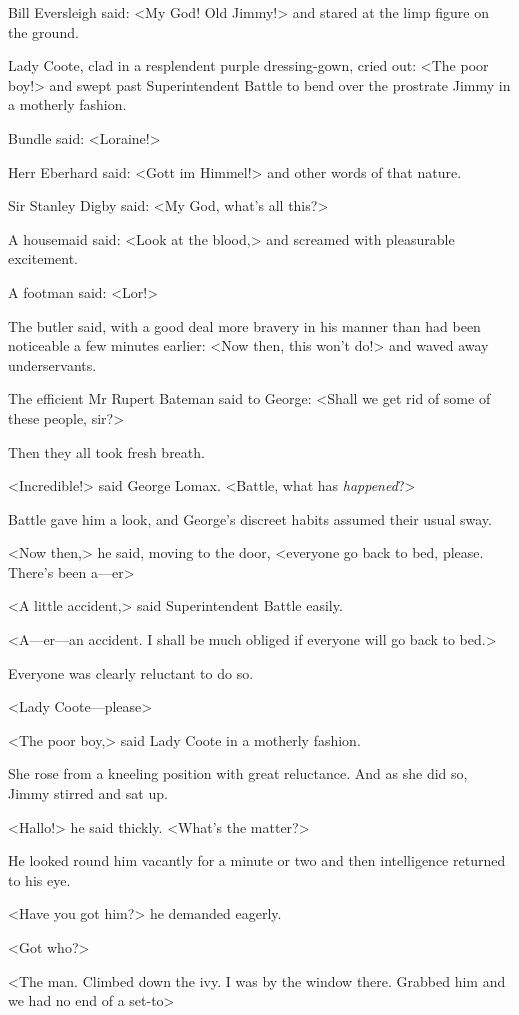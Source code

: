 Bill Eversleigh said: <My God! Old Jimmy!> and stared at the limp figure on the ground.

Lady Coote, clad in a resplendent purple dressing-gown, cried out: <The poor boy!> and swept past Superintendent Battle to bend over the prostrate Jimmy in a motherly fashion.

Bundle said: <Loraine!>

Herr Eberhard said: <Gott im Himmel!> and other words of that nature.

Sir Stanley Digby said: <My God, what's all this?>

A housemaid said: <Look at the blood,> and screamed with pleasurable excitement.

A footman said: <Lor!>

The butler said, with a good deal more bravery in his manner than had been noticeable a few minutes earlier: <Now then, this won't do!> and waved away underservants.

The efficient Mr Rupert Bateman said to George: <Shall we get rid of some of these people, sir?>

Then they all took fresh breath.

<Incredible!> said George Lomax. <Battle, what has \emph{happened}?>

Battle gave him a look, and George's discreet habits assumed their usual sway.

<Now then,> he said, moving to the door, <everyone go back to bed, please. There's been a—er\longdash>

<A little accident,> said Superintendent Battle easily.

<A—er—an accident. I shall be much obliged if everyone will go back to bed.>

Everyone was clearly reluctant to do so.

<Lady Coote—please\longdash>

<The poor boy,> said Lady Coote in a motherly fashion.

She rose from a kneeling position with great reluctance. And as she did so, Jimmy stirred and sat up.

<Hallo!> he said thickly. <What's the matter?>

He looked round him vacantly for a minute or two and then intelligence returned to his eye.

<Have you got him?> he demanded eagerly.

<Got who?>

<The man. Climbed down the ivy. I was by the window there. Grabbed him and we had no end of a set-to\longdash>


